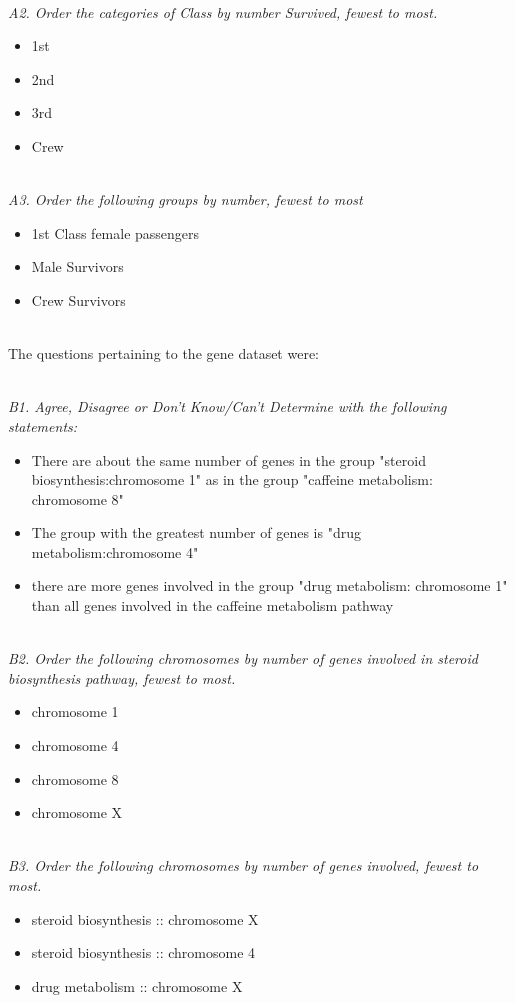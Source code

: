 \noindent \\ \emph{A2. Order the categories of Class by number Survived, fewest to most.} 
\begin{itemize}
\item 1st
\item 2nd 
\item 3rd
\item Crew
\end{itemize}

\noindent \\ \emph{A3. Order the following groups by number, fewest to most}
\begin{itemize}
\item 1st Class female passengers
\item Male Survivors
\item Crew Survivors
\end{itemize}


\noindent \\  The questions pertaining to the gene dataset were: 

\noindent \\ \emph{B1. Agree, Disagree or Don't Know/Can't Determine with the following statements:}
\begin{itemize}
\item There are about the same number of genes in the group "steroid biosynthesis:chromosome 1" as in the group "caffeine metabolism: chromosome 8"
\item The group with the greatest number of genes is "drug metabolism:chromosome 4"
\item there are more genes involved in the group "drug metabolism: chromosome 1" than all genes involved in the caffeine metabolism pathway
\end{itemize}

\noindent \\ \emph{B2. Order the following chromosomes by number of genes involved in steroid biosynthesis pathway, fewest to most.}
\begin{itemize}
\item chromosome 1
\item chromosome 4
\item chromosome 8 
\item chromosome X
\end{itemize}

\noindent \\ \emph{B3. Order the following chromosomes by number of genes involved, fewest to most.}
\begin{itemize}
\item steroid biosynthesis :: chromosome X
\item steroid biosynthesis :: chromosome 4
\item drug metabolism :: chromosome X
\end{itemize} 

